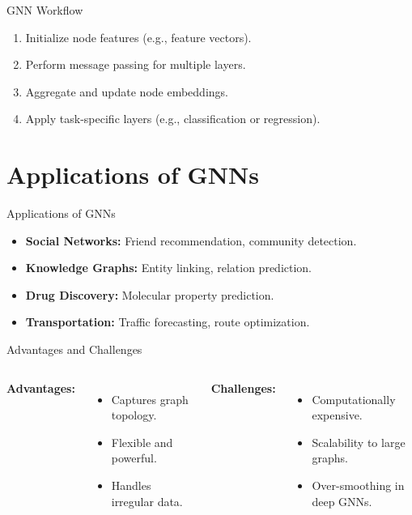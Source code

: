 \documentclass{beamer}
\begin{document}
\begin{frame}{GNN Workflow}
    \begin{enumerate}
        \item Initialize node features (e.g., feature vectors).
        \item Perform message passing for multiple layers.
        \item Aggregate and update node embeddings.
        \item Apply task-specific layers (e.g., classification or regression).
    \end{enumerate}
\end{frame}

\section{Applications of GNNs}
\begin{frame}{Applications of GNNs}
    \begin{itemize}
        \item \textbf{Social Networks:} Friend recommendation, community detection.
        \item \textbf{Knowledge Graphs:} Entity linking, relation prediction.
        \item \textbf{Drug Discovery:} Molecular property prediction.
        \item \textbf{Transportation:} Traffic forecasting, route optimization.
    \end{itemize}
\end{frame}

\begin{frame}{Advantages and Challenges}
    \begin{columns}
        \textbf{Advantages:}
        \begin{itemize}
            \item Captures graph topology.
            \item Flexible and powerful.
            \item Handles irregular data.
        \end{itemize}

        \textbf{Challenges:}
        \begin{itemize}
            \item Computationally expensive.
            \item Scalability to large graphs.
            \item Over-smoothing in deep GNNs.
        \end{itemize}
    \end{columns}
\end{frame}
\end{document}
